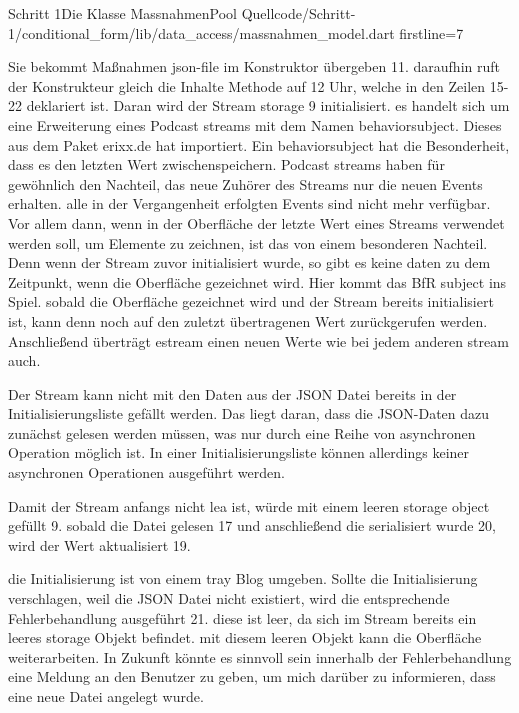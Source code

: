 {\begin{alexlisting}{Schritt 1}{Die Klasse MassnahmenPool}
  {Quellcode/Schritt-1/conditional_form/lib/data_access/massnahmen_model.dart}
  {firstline=7}
  \label{lst:Schritt1KlasseMassnahmenPool}
\end{alexlisting}

Sie bekommt Maßnahmen json-file  im Konstruktor übergeben 11.  daraufhin ruft der Konstrukteur gleich die Inhalte Methode auf 12 Uhr, welche in den Zeilen 15-22 deklariert ist. Daran wird der Stream storage 9 initialisiert.  es handelt sich um eine Erweiterung eines  Podcast streams mit dem Namen behaviorsubject. Dieses aus dem Paket erixx.de hat importiert. Ein behaviorsubject hat die Besonderheit, dass es den  letzten Wert zwischenspeichern.  Podcast streams haben für gewöhnlich den Nachteil, das neue Zuhörer des Streams nur die neuen Events erhalten.  alle in der Vergangenheit erfolgten Events sind nicht mehr verfügbar. Vor allem dann, wenn in der Oberfläche der letzte Wert eines Streams verwendet werden soll, um Elemente zu zeichnen, ist das von einem besonderen Nachteil. Denn wenn der Stream zuvor initialisiert wurde, so gibt es keine daten zu dem Zeitpunkt, wenn die Oberfläche gezeichnet wird. Hier kommt das BfR subject ins Spiel.  sobald die Oberfläche gezeichnet wird und der Stream bereits initialisiert ist,  kann denn noch auf  den zuletzt übertragenen Wert zurückgerufen werden. Anschließend überträgt estream einen neuen Werte wie bei jedem anderen stream auch.

Der Stream kann nicht mit den Daten aus der JSON Datei bereits in der Initialisierungsliste gefällt werden. Das liegt daran, dass die JSON-Daten dazu zunächst gelesen werden müssen, was nur durch eine Reihe von asynchronen Operation möglich ist. In einer Initialisierungsliste können allerdings keiner asynchronen Operationen ausgeführt werden.

 Damit der Stream anfangs nicht lea ist, würde mit einem leeren storage object gefüllt 9.  sobald die Datei gelesen 17  und anschließend die serialisiert wurde 20,  wird der Wert aktualisiert 19.

 die Initialisierung ist von einem tray Blog umgeben.  Sollte die Initialisierung verschlagen, weil die JSON Datei nicht existiert,  wird die entsprechende Fehlerbehandlung ausgeführt 21.  diese ist leer, da sich im Stream bereits ein leeres  storage Objekt  befindet.  mit diesem leeren Objekt kann die Oberfläche weiterarbeiten. In Zukunft könnte es sinnvoll sein innerhalb der Fehlerbehandlung eine Meldung an den Benutzer zu geben, um mich darüber zu informieren, dass eine neue Datei angelegt wurde.

}
